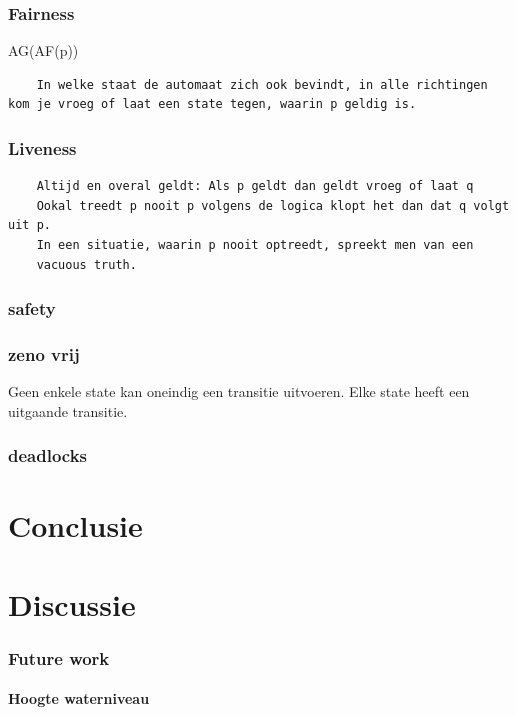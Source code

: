 \subsection{Fairness}
AG(AF(p))
\begin{verbatim}
	In welke staat de automaat zich ook bevindt, in alle richtingen kom je vroeg of laat een state tegen, waarin p geldig is.
\end{verbatim}
\subsection{Liveness}
\begin{verbatim}
	Altijd en overal geldt: Als p geldt dan geldt vroeg of laat q
	Ookal treedt p nooit p volgens de logica klopt het dan dat q volgt uit p.
	In een situatie, waarin p nooit optreedt, spreekt men van een
	vacuous truth.
\end{verbatim}

 

\subsection{safety}

\subsection{zeno vrij}
Geen enkele state kan oneindig een transitie uitvoeren. Elke state heeft een uitgaande transitie.

\subsection{deadlocks}
\chapter{Conclusie}




\chapter{Discussie}

\subsection{Future work}
\subsubsection{Hoogte waterniveau}

